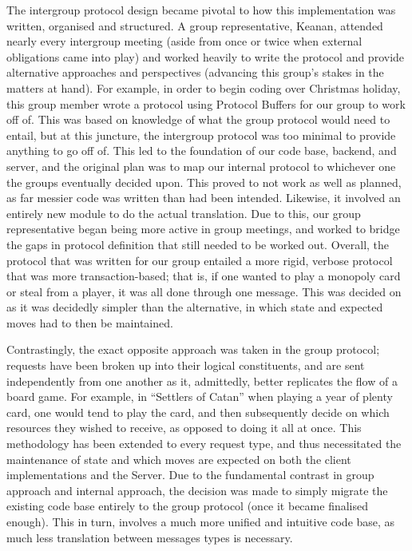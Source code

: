 \documentclass[a4paper,doc]{apa6}
\begin{document}
The intergroup protocol design became pivotal to how this implementation was written, organised and structured. A group representative, Keanan, attended nearly every intergroup meeting (aside from once or twice when external obligations came into play) and worked heavily to write the protocol and provide alternative approaches and perspectives (advancing this group’s stakes in the matters at hand). For example, in order to begin coding over Christmas holiday, this group member wrote a protocol using Protocol Buffers for our group to work off of. This was based on knowledge of what the group protocol would need to entail, but at this juncture, the intergroup protocol was too minimal to provide anything to go off of. This led to the foundation of our code base, backend, and server, and the original plan was to map our internal protocol to whichever one the groups eventually decided upon. This proved to not work as well as planned, as far messier code was written than had been intended. Likewise, it involved an entirely new module to do the actual translation. Due to this, our group representative began being more active in group meetings, and worked to bridge the gaps in protocol definition that still needed to be worked out. Overall, the protocol that was written for our group entailed a more rigid, verbose protocol that was more transaction-based; that is, if one wanted to play a monopoly card or steal from a player, it was all done through one message. This was decided on as it was decidedly simpler than the alternative, in which state and expected moves had to then be maintained.

Contrastingly, the exact opposite approach was taken in the group protocol; requests have been broken up into their logical constituents, and are sent independently from one another as it, admittedly, better replicates the flow of a board game. For example, in “Settlers of Catan” when playing a year of plenty card, one would tend to play the card, and then subsequently decide on which resources they wished to receive, as opposed to doing it all at once. This methodology has been extended to every request type, and thus necessitated the maintenance of state and which moves are expected on both the client implementations and the Server. Due to the fundamental contrast in group approach and internal approach, the decision was made to simply migrate the existing code base entirely to the group protocol (once it became finalised enough). This in turn, involves a much more unified and intuitive code base, as much less translation between messages types is necessary.
\end{document}
